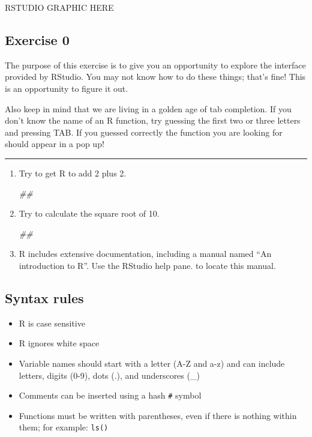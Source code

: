 \documentclass[
]{book}
\newenvironment{Shaded}{\begin{snugshade}}{\end{snugshade}}
\newcommand{\CommentTok}[1]{\textcolor[rgb]{0.56,0.35,0.01}{\textit{#1}}}
\providecommand{\tightlist}{%
  \setlength{\itemsep}{0pt}\setlength{\parskip}{0pt}}
\begin{document}
RSTUDIO GRAPHIC HERE

\hypertarget{exercise-0}{%
\subsection{Exercise 0}\label{exercise-0}}

The purpose of this exercise is to give you an opportunity to explore
the interface provided by RStudio. You may not know how to do these things;
that's fine! This is an opportunity to figure it out.

Also keep in mind that we are living in a golden age of tab completion.
If you don't know the name of an R function, try guessing the first two
or three letters and pressing TAB. If you guessed correctly the function
you are looking for should appear in a pop up!

\begin{center}\rule{0.5\linewidth}{\linethickness}\end{center}

\begin{enumerate}
\def\labelenumi{\arabic{enumi}.}
\item
  Try to get R to add 2 plus 2.

\begin{Shaded}
\begin{Highlighting}[]
\CommentTok{##}
\end{Highlighting}
\end{Shaded}
\item
  Try to calculate the square root of 10.

\begin{Shaded}
\begin{Highlighting}[]
\CommentTok{##}
\end{Highlighting}
\end{Shaded}
\item
  R includes extensive documentation, including a manual named ``An
  introduction to R''. Use the RStudio help pane. to locate this manual.
\end{enumerate}

\hypertarget{syntax-rules}{%
\subsection{Syntax rules}\label{syntax-rules}}

\begin{itemize}
\tightlist
\item
  R is case sensitive
\item
  R ignores white space
\item
  Variable names should start with a letter (A-Z and a-z)
  and can include letters, digits (0-9), dots (.), and underscores (\_)
\item
  Comments can be inserted using a hash \texttt{\#} symbol
\item
  Functions must be written with parentheses, even
  if there is nothing within them; for example: \texttt{ls()}
\end{itemize}
\end{document}
